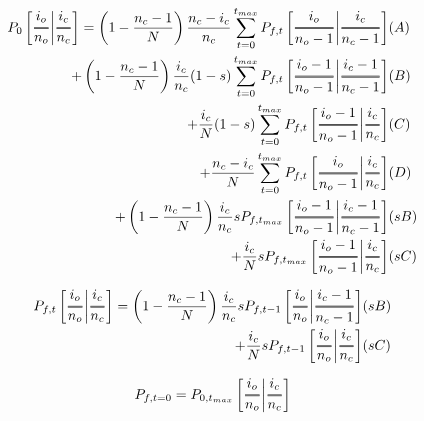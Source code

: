 \documentclass[preview]{standalone}
\newcommand{\Dfrac}[2]{%
  \ooalign{%
    $\genfrac{}{}{1.2pt}0{#1}{#2}$\cr%
    $\color{white}\genfrac{}{}{.4pt}0{\phantom{#1}}{\phantom{#2}}$}%
}
\newcommand{\cond}{\middle\vert}
\begin{document}
\begin{equation*}
  \begin{aligned}
    P_0\left[ \Dfrac{i_o}{n_o} \cond \Dfrac{i_c}{n_c} \right]
    = \left(1-\frac{n_c-1}{N}\right) \frac{n_c-i_c}{n_c}       \sum_{t=0}^{t_{max}}P_{f,t}        \left[ \Dfrac{i_o  }{n_o-1} \cond \Dfrac{i_c  }{n_c-1} \right]& (A) \\
    + \left(1-\frac{n_c-1}{N}\right) \frac{i_c}{n_c}     (1-s) \sum_{t=0}^{t_{max}}P_{f,t}        \left[ \Dfrac{i_o-1}{n_o-1} \cond \Dfrac{i_c-1}{n_c-1} \right]& (B) \\
    +                                \frac{i_c}{N}       (1-s) \sum_{t=0}^{t_{max}}P_{f,t}        \left[ \Dfrac{i_o-1}{n_o-1} \cond \Dfrac{i_c  }{n_c  } \right]& (C) \\
    +                                \frac{n_c-i_c}{N}         \sum_{t=0}^{t_{max}}P_{f,t}        \left[ \Dfrac{i_o  }{n_o-1} \cond \Dfrac{i_c  }{n_c  } \right]& (D) \\
    + \left(1-\frac{n_c-1}{N}\right) \frac{i_c}{n_c}        s                    P_{f,t_{max}}    \left[ \Dfrac{i_o-1}{n_o-1} \cond \Dfrac{i_c-1}{n_c-1} \right]& (sB) \\
    +                                \frac{i_c}{N}          s                    P_{f,t_{max}}    \left[ \Dfrac{i_o-1}{n_o-1} \cond \Dfrac{i_c  }{n_c  } \right]& (sC) \\
  \end{aligned}
\end{equation*}

\begin{equation*}
  \begin{aligned}
    P_{f,t}\left[ \Dfrac{i_o}{n_o} \cond \Dfrac{i_c}{n_c} \right]
    = \left(1-\frac{n_c-1}{N}\right) \frac{i_c}{n_c}        s                    P_{f,t-1}        \left[ \Dfrac{i_o  }{n_o  } \cond \Dfrac{i_c-1}{n_c-1} \right]& (sB) \\
    +                                \frac{i_c}{N}          s                    P_{f,t-1}        \left[ \Dfrac{i_o  }{n_o  } \cond \Dfrac{i_c  }{n_c  } \right]& (sC) \\
  \end{aligned}
\end{equation*}

\begin{equation*}
  P_{f,t=0} = P_{0,t_{max}} \left[ \Dfrac{i_o}{n_o} \cond \Dfrac{i_c}{n_c} \right]
\end{equation*}
\end{document}
